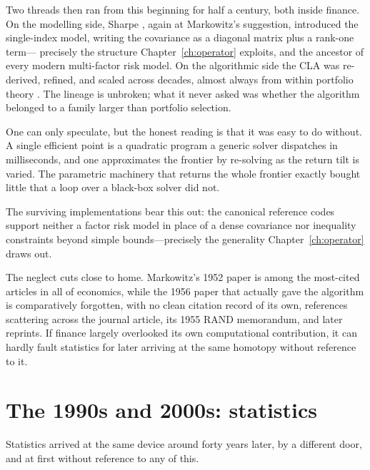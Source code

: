 Two threads then ran from this beginning for half a century, both inside finance. On the
modelling side, Sharpe \cite{sharpe1963}, again at Markowitz's suggestion, introduced the
single-index model, writing the covariance as a diagonal matrix plus a rank-one term---
precisely the structure Chapter~\ref{ch:operator} exploits, and the ancestor of every
modern multi-factor risk model. On the algorithmic side the CLA was re-derived, refined,
and scaled across decades, almost always from within portfolio theory
\cite{perold1984,hirschberger2010,niedermayer2010,markowitz2000,stein2008,bailey2013,markowitz2021}.
The lineage is unbroken; what it never asked was whether the algorithm belonged to a
family larger than portfolio selection.

\begin{remark}
One can only speculate, but the honest reading is that it was easy to do without. A
single efficient point is a quadratic program a generic solver dispatches in
milliseconds, and one approximates the frontier by re-solving as the return tilt is
varied. The parametric machinery that returns the whole frontier exactly bought little
that a loop over a black-box solver did not.

The surviving implementations bear this out: the canonical reference codes support
neither a factor risk model in place of a dense covariance nor inequality constraints
beyond simple bounds---precisely the generality Chapter~\ref{ch:operator} draws out.

The neglect cuts close to home. Markowitz's 1952 paper is among the most-cited articles
in all of economics, while the 1956 paper that actually gave the algorithm is
comparatively forgotten, with no clean citation record of its own, references scattering
across the journal article, its 1955 RAND memorandum, and later reprints. If finance
largely overlooked its own computational contribution, it can hardly fault statistics for
later arriving at the same homotopy without reference to it.
\end{remark}

\section{The 1990s and 2000s: statistics}

Statistics arrived at the same device around forty years later, by a different door, and
at first without reference to any of this.


